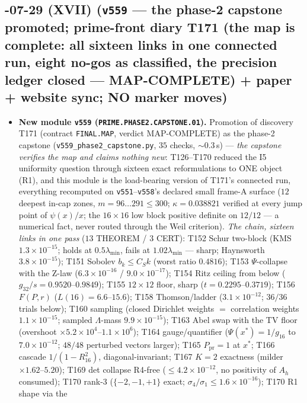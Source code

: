 \documentclass[11pt]{article}
\begin{document}
\subsection*{-07-29 (XVII) (\texttt{v559} --- the phase-2 capstone promoted; prime-front diary T171 (the map is complete: all sixteen links in one connected run, eight no-gos as classified, the precision ledger closed --- MAP-COMPLETE) + paper + website sync; NO marker moves)}
\begin{itemize}[leftmargin=1.5em]
\item \textbf{New module \texttt{v559} (\texttt{PRIME.PHASE2.CAPSTONE.01}).} Promotion of
discovery T171 (contract \texttt{FINAL.MAP}, verdict MAP-COMPLETE) as the phase-2
capstone (\texttt{v559\_phase2\_capstone.py}, $35$ checks, ${\sim}0.3$\,s) --- \emph{the
capstone verifies the map and claims nothing new}: T126--T170 reduced the I5 uniformity
question through sixteen exact reformulations to ONE object (R1), and this module is the
load-bearing version of T171's connected run, everything recomputed on
\texttt{v551}--\texttt{v558}'s declared small frame-A surface ($12$ deepest in-cap
zones, $m=96\ldots291\le300$; $\kappa=0.038821$ verified at every jump point of
$\psi(x)/x$; the $16\times16$ low block positive definite on $12/12$ --- a numerical
fact, never routed through the Weil criterion). \emph{The chain, sixteen links in one
pass} ($13$ THEOREM / $3$ CERT): T152 Schur two-block (KMS $1.3\times10^{-15}$; holds at
$0.5\lambda_{\min}$, fails at $1.02\lambda_{\min}$ --- sharp; Haynsworth
$3.8\times10^{-15}$); T151 Sobolev $b_k\le C_Sk$ (worst ratio $0.4816$); T153
$\Psi$-collapse with the Z-law ($6.3\times10^{-16}$ / $9.0\times10^{-17}$); T154 Ritz
ceiling from below ($g_{32}/s=0.9520$--$0.9849$); T155 $12\times12$ floor, sharp
($t=0.2295$--$0.3719$); T156 $F(P,r)$ ($L(16)=6.6$--$15.6$); T158 Thomson/ladder
($3.1\times10^{-12}$; $36/36$ trials below); T160 sampling (closed Dirichlet weights
$=$ correlation weights $1.1\times10^{-15}$; sampled $\Lambda$-mass
$9.9\times10^{-15}$); T163 Abel swap with the TV floor (overshoot
$\times5.2\times10^{4}$--$1.1\times10^{6}$); T164 gauge/quantifier
($\Psi(x^*)=1/g_{16}$ to $7.0\times10^{-12}$; $48/48$ perturbed vectors larger); T165
$P_{\mathrm{pr}}=1$ at $x^*$; T166 cascade $1/(1-R_{16}^2)$, diagonal-invariant; T167
$K=2$ exactness (milder $\times1.62$--$5.20$); T169 det collapse R4-free
($\le4.2\times10^{-12}$, no positivity of $A_h$ consumed); T170 rank-3
($\{-2,-1,+1\}$ exact; $\sigma_4/\sigma_1\le1.6\times10^{-16}$); T170 R1 shape via the

\end{itemize}
\end{document}
